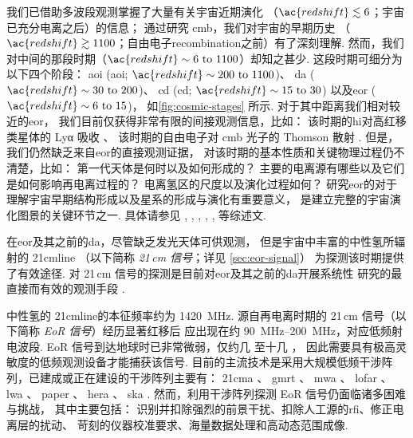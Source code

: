 我们已借助多波段观测掌握了大量有关宇宙近期演化
（$\ac{redshift} \lesssim 6$；宇宙已充分电离之后）的信息；
通过研究 \ac{cmb}，我们对宇宙的早期历史
（$\ac{redshift} \gtrsim 1100$；自由电子\ac{recombination}之前）有了深刻理解.
然而，我们对中间的那段时期（$\ac{redshift} \sim \numrange{6}{1100}$）却知之甚少.
这段时期可细分为以下四个阶段\cite{koopmans2015}：
\acs{aoi} (\acl{aoi}; $\ac{redshift} \sim \numrange{200}{1100}$)、
\acs{da} ($\ac{redshift} \sim \numrange{30}{200}$)、
\acs{cd} (\acl{cd}; $\ac{redshift} \sim \numrange{15}{30}$)
以及\acl{eor} ($\ac{redshift} \sim \numrange{6}{15}$)，
如\autoref{fig:cosmic-stages} 所示.
对于其中距离我们相对较近的\acl{eor}，
我们目前仅获得非常有限的间接观测信息，比如：
该时期的\ac{hi}对高红移类星体的 Lyα 吸收 \cite{becker2001}、
该时期的自由电子对 \ac{cmb} 光子的 Thomson 散射 \cite{kaplinghat2003}.
但是，我们仍然缺乏来自\acl{eor}的直接观测证据，
对该时期的基本性质和关键物理过程仍不清楚，比如：
第一代天体是何时以及如何形成的？
主要的电离源有哪些以及它们是如何影响再电离过程的？
电离氢区的尺度以及演化过程如何？
研究\acl{eor}的对于理解宇宙早期结构形成以及星系的形成与演化有重要意义，
是建立完整的宇宙演化图景的关键环节之一.
具体请参见 , ,
, ,
,  等综述文.

在\acl{eor}及其之前的\ac{da}，尽管缺乏发光天体可供观测，
但是宇宙中丰富的中性氢所辐射的 \ac{21cmline}
（以下简称 \emph{21\,cm 信号}；详见 \autoref{sec:eor-signal}）
为探测该时期提供了有效途径.
对 21\,cm 信号的探测是目前对\acl{eor}及其之前的\ac{da}开展系统性
研究的最直接而有效的观测手段
\cite{madau1997,tozzi2000,furlanetto2006,koopmans2015,furlanetto2016}.

中性氢的 \ac{21cmline}的本征频率约为 \SI{1420}{\MHz}.
源自再电离时期的 21\,cm 信号（以下简称 \emph{EoR 信号}）经历显著红移后
应出现在约 \SIrange{90}{200}{\MHz}，对应低频射电波段.
EoR 信号到达地球时已非常微弱，仅约几 \si{\mK} 至十几 \si{\mK}，
因此需要具有极高灵敏度的低频观测设备才能捕获该信号.
目前的主流技术是采用大规模低频干涉阵列，已建成或正在建设的干涉阵列主要有：
\ac{21cma} \cite{zheng2016}、
\ac{gmrt} \cite{paciga2011}、
\ac{mwa} \cite{bowman2013,tingay2013}、
\ac{lofar} \cite{vanHaarlem2013}、
\ac{lwa} \cite{ellingson2009}、
\ac{paper} \cite{parsons2010}、
\ac{hera} \cite{deBoer2017}、
\ac{ska} \cite{mellema2013,koopmans2015}.
然而，利用干涉阵列探测 EoR 信号仍面临诸多困难与挑战\cite{wijnholds2010}，
其中主要包括：
识别并扣除强烈的前景干扰、扣除人工源的\ac{rfi}、修正电离层的扰动、
苛刻的仪器校准要求、海量数据处理和高动态范围成像.

